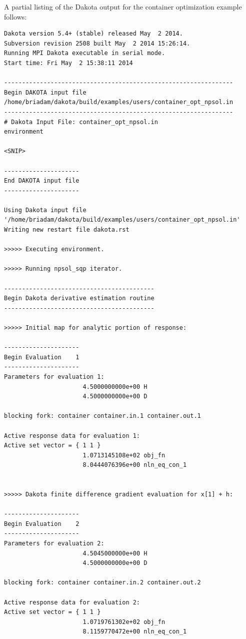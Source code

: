 \clearpage

A partial listing of the Dakota output for the container optimization
example follows:
\begin{small}
\begin{verbatim}
Dakota version 5.4+ (stable) released May  2 2014.
Subversion revision 2508 built May  2 2014 15:26:14.
Running MPI Dakota executable in serial mode.
Start time: Fri May  2 15:38:11 2014

----------------------------------------------------------------
Begin DAKOTA input file
/home/briadam/dakota/build/examples/users/container_opt_npsol.in
----------------------------------------------------------------
# Dakota Input File: container_opt_npsol.in
environment

<SNIP>

---------------------
End DAKOTA input file
---------------------

Using Dakota input file '/home/briadam/dakota/build/examples/users/container_opt_npsol.in'
Writing new restart file dakota.rst

>>>>> Executing environment.

>>>>> Running npsol_sqp iterator.

------------------------------------------
Begin Dakota derivative estimation routine
------------------------------------------

>>>>> Initial map for analytic portion of response:

---------------------
Begin Evaluation    1
---------------------
Parameters for evaluation 1:
                      4.5000000000e+00 H
                      4.5000000000e+00 D

blocking fork: container container.in.1 container.out.1

Active response data for evaluation 1:
Active set vector = { 1 1 }
                      1.0713145108e+02 obj_fn
                      8.0444076396e+00 nln_eq_con_1


>>>>> Dakota finite difference gradient evaluation for x[1] + h:

---------------------
Begin Evaluation    2
---------------------
Parameters for evaluation 2:
                      4.5045000000e+00 H
                      4.5000000000e+00 D

blocking fork: container container.in.2 container.out.2

Active response data for evaluation 2:
Active set vector = { 1 1 }
                      1.0719761302e+02 obj_fn
                      8.1159770472e+00 nln_eq_con_1



\end{verbatim}
\end{small}
